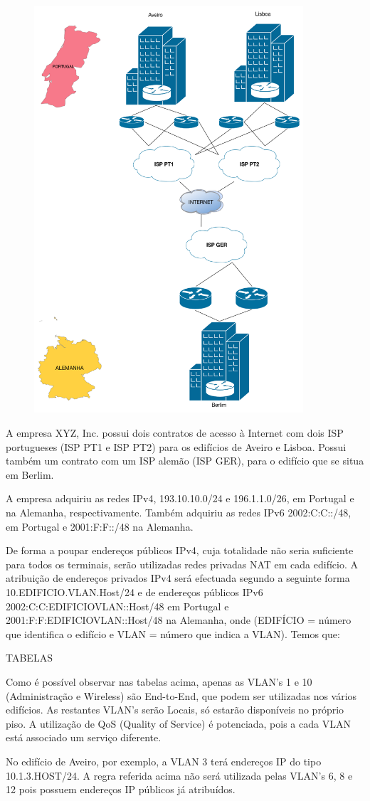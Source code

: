 \documentclass[pdftex,12pt,a4paper]{report}
\begin{document}
\begin{figure}[ht!]
\centering
\includegraphics[width=100mm]{visao_global.png}
\end{figure}

\newpage

	A empresa XYZ, Inc. possui dois contratos de acesso à Internet com dois ISP portugueses (ISP PT1 e ISP PT2) para os edifícios de Aveiro e Lisboa. Possui também um contrato com um ISP alemão (ISP GER), para o edifício que se situa em Berlim.
	
	A empresa adquiriu as redes IPv4, 193.10.10.0/24 e 196.1.1.0/26, em Portugal e na Alemanha, respectivamente. Também adquiriu as redes IPv6 2002:C:C::/48, em Portugal e 2001:F:F::/48 na Alemanha.
	
	De forma a poupar endereços públicos IPv4, cuja totalidade não seria suficiente para todos os terminais, serão utilizadas redes privadas NAT em cada edifício. A atribuição de endereços privados IPv4 será efectuada segundo a seguinte forma 10.EDIFICIO.VLAN.Host/24  e de endereços públicos IPv6 2002:C:C:EDIFICIOVLAN::Host/48 em Portugal e 2001:F:F:EDIFICIOVLAN::Host/48 na Alemanha, onde (EDIFÍCIO = número que identifica o edifício e VLAN = número que indica a VLAN). Temos que:
	
	TABELAS
	
	Como é possível observar nas tabelas acima, apenas as VLAN’s 1 e 10 (Administração e Wireless) são End-to-End, que podem ser utilizadas nos vários edifícios. As restantes VLAN’s serão Locais, só estarão disponíveis no próprio piso. A utilização de QoS (Quality of Service) é potenciada, pois a cada VLAN está associado um serviço diferente.

	No edifício de Aveiro, por exemplo,  a VLAN 3 terá endereços IP do tipo 10.1.3.HOST/24.	
	A regra referida acima não será utilizada pelas VLAN’s 6, 8 e 12 pois possuem endereços IP públicos já atribuídos.
\end{document}
